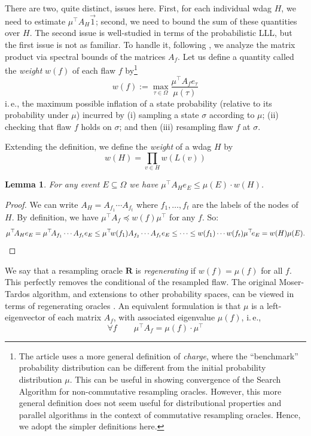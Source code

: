 \documentclass[11pt]{article}
\newtheorem{lemma}[theorem]{Lemma}
\newcommand{\ie}{i.\,e.}
\begin{document}
There are two, quite distinct, issues here. First, for each individual wdag $H$, we need to estimate $\mu^{\top} A_H \vec 1 $; second, we need to bound the sum of these quantities over $H$. The second issue is well-studied in terms of the probabilistic LLL, but the first issue is not as familiar. To handle it, following \cite{AIS}, we analyze the matrix product via  spectral bounds of the matrices $A_f$.  Let us define a quantity called the \emph{weight} $w(f)$ of each flaw $f$ by\footnote{The
%
article  %
  \cite{AIS} uses a more general definition of \emph{charge}, where the ``benchmark'' probability distribution can be different from the initial probability distribution $\mu$. This can be useful in showing convergence of the Search Algorithm for non-commutative resampling oracles. However, this more general definition does not seem useful for distributional properties and parallel algorithms in the context of commutative resampling oracles. Hence, we adopt the simpler definitions here.}
$$
w(f) :=  \max_{\tau \in \Omega}  \frac{\mu^{\top} A_f e_{\tau}}{ \mu(\tau) } 
$$\ie, the maximum possible inflation of a state probability (relative to its probability under $\mu$) incurred by (i) sampling a state $\sigma$ according to $\mu$; (ii) checking that flaw $f$ holds on $\sigma$; and then (iii) resampling flaw $f$ at $\sigma$.



Extending the definition, we define the \emph{weight} of a wdag $H$ by
$$
w(H) = \prod_{v \in H} w(L(v))
$$
\begin{lemma}
  \label{a1}
  For any event $E \subseteq \Omega$ we have $\mu^{\top} A_H e_E \leq  \mu(E) \cdot w(H)$.   
\end{lemma}
\begin{proof}
We can write $A_H = A_{f_1} \cdots A_{f_t}$ where $f_1, \dots, f_t$ are the labels of the nodes of $H$.  By definition, we have $\mu^{\top} A_f \preceq w(f)  \mu^{\top}$ for any $f$. So:
\[
 \mu^{\top} \negthinspace A_H e_E =   \mu^{\top} \negthinspace A_{f_1} \cdots A_{f_t} e_E  \leq \mu^{\top} \negthinspace w(f_1) A_{f_2} \cdots A_{f_t} e_E \leq \dots \leq w(f_1) \cdots w(f_t) \mu^{\top} \negthinspace e_E = w(H) \mu(E).   \qedhere
\]
\end{proof}


We say that a resampling oracle $\mathbf R$ is \emph{regenerating} if $w(f) = \mu(f)$ for all $f$. This perfectly removes the conditional of the resampled flaw.   The original Moser-Tardos algorithm, and extensions to other probability spaces, can be viewed in terms of regenerating oracles \cite{HV}. An equivalent formulation is that  $\mu$ is a left-eigenvector of each matrix $A_f$, with associated eigenvalue $\mu(f)$, \ie,
\begin{equation}
\label{regen-def}
\forall f \qquad \mu^{\top} A_f = \mu(f) \cdot \mu^{\top}
\end{equation}
\end{document}
